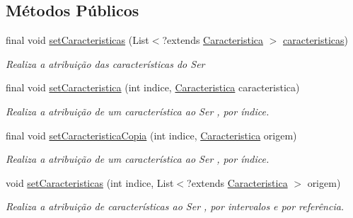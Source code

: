 \subsection*{Métodos Públicos}
\begin{DoxyCompactItemize}
\item 
final void \hyperlink{classic_1_1populacional_1_1_ser_3_01_n_01extends_01_number_01_4_a19c8848c6dcd4268c8c9b36cff08064f}{set\-Caracteristicas} (List$<$?extends \hyperlink{classic_1_1populacional_1_1_caracteristica}{Caracteristica} $>$ \hyperlink{classic_1_1populacional_1_1_ser_3_01_n_01extends_01_number_01_4_a2006e8efb9bf95aa5e6b04a294c4f171}{caracteristicas})
\begin{DoxyCompactList}\small\item\em Realiza a atribuição das {\ttfamily características} do {\ttfamily Ser}\end{DoxyCompactList}\item 
final void \hyperlink{classic_1_1populacional_1_1_ser_3_01_n_01extends_01_number_01_4_aaf647b2a050816a2650948edc1d76629}{set\-Caracteristica} (int indice, \hyperlink{classic_1_1populacional_1_1_caracteristica}{Caracteristica} caracteristica)
\begin{DoxyCompactList}\small\item\em Realiza a atribuição de um {\ttfamily característica} ao {\ttfamily Ser} , por índice. \end{DoxyCompactList}\item 
final void \hyperlink{classic_1_1populacional_1_1_ser_3_01_n_01extends_01_number_01_4_aae213988d2dbcbee6ca6d7f9b20dd3ed}{set\-Caracteristica\-Copia} (int indice, \hyperlink{classic_1_1populacional_1_1_caracteristica}{Caracteristica} origem)
\begin{DoxyCompactList}\small\item\em Realiza a atribuição de um {\ttfamily característica} ao {\ttfamily Ser} , por índice. \end{DoxyCompactList}\item 
void \hyperlink{classic_1_1populacional_1_1_ser_3_01_n_01extends_01_number_01_4_ada705c21d34153749a07f3ac21b7a104}{set\-Caracteristicas} (int indice, List$<$?extends \hyperlink{classic_1_1populacional_1_1_caracteristica}{Caracteristica} $>$ origem)
\begin{DoxyCompactList}\small\item\em Realiza a atribuição de {\ttfamily características} ao {\ttfamily Ser} , por intervalos e por referência. \end{DoxyCompactList}\item 

\end{DoxyCompactItemize}
